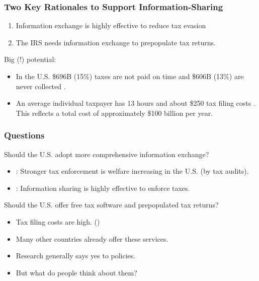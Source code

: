 \documentclass{beamer}
\begin{document}
\begin{frame}
\frametitle{Two Key Rationales to Support Information-Sharing}
\begin{enumerate}
    \item Information exchange is \alert{highly effective to reduce tax evasion} \parencite{kleven2011unwilling,pomeranz2015no,slemrod2017does}
    \vspace{0.5em}
    \item The IRS needs information exchange to \alert{prepopulate tax returns}.
\end{enumerate}
\vspace{2em}
Big (!) potential: 
\vspace{0.5em}
\begin{itemize}
    \item In the U.S. \$696B (15\%) taxes are not paid on time and \$606B (13\%) are never collected \parencite{IRS_TaxGap_2022_Pub5869}.
    \vspace{0.5em}
    \item An average individual taxpayer has 13 hours and about \$250 tax filing costs \parencite{IRS2022}. This reflects a total cost of approximately \$100 billion per year. 
\end{itemize}
\end{frame}

\begin{frame}
\frametitle{Questions}
Should the U.S. adopt more comprehensive information exchange? 
\begin{itemize}
    \item \cite{boning2025welfare}: Stronger tax enforcement is welfare increasing in the U.S. (by tax audits).
    \item \cite{kleven2011unwilling,pomeranz2015no,slemrod2017does}: Information sharing is highly effective to enforce taxes. 
\end{itemize}
\vspace{1em}
Should the U.S. offer free tax software and prepopulated tax returns?
\begin{itemize}
    \item Tax filing costs are high. (\cite{IRS2022}) \\[0.2em]
    \item Many other countries already offer these services.
\end{itemize}
\vspace{1em}
\begin{itemize}
    \item[$\Rightarrow$] \alert{Research generally says yes to policies.} 
    \item[$\Rightarrow$] \alert{But what do people think about them?}
\end{itemize}
\end{frame}
\end{document}
